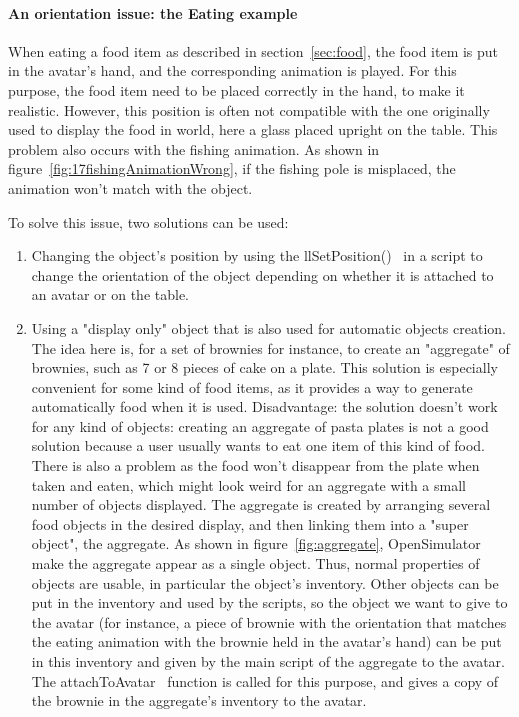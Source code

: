 {\begin{itemize}
\begin{itemize}
\paragraph{An orientation issue: the Eating example}
When eating a food item as described in section~\ref{sec:food}, the food item is put in the avatar's hand, and the corresponding animation is played. For this purpose, the food item need to be placed correctly in the hand, to make it realistic. However, 
this position is often not compatible with the one originally used to display the food in world, here a glass placed upright on the table. This problem also occurs with the fishing animation. As shown in figure~\ref{fig:17fishingAnimationWrong}, if the fishing pole is misplaced, the animation won't match with the object.

To solve this issue, two solutions can be used: 
\begin{enumerate}
\item Changing the object's position by using the llSetPosition()~\cite{llSetPositionWebsite} in a script to change the orientation of the object depending on whether it is attached to an avatar or on the table. 
\item Using a "display only" object that is also used for automatic objects creation. The idea here is, for a set of brownies for instance, to create an "aggregate" of brownies, such as 7 or 8 pieces of cake on a plate.
This solution is especially convenient for some kind of food items, as it provides a way to generate automatically food when it is used. Disadvantage: the solution doesn't work for any kind of objects: creating an aggregate of pasta plates is not a good solution because a user usually wants to eat one item of this kind of food. There is also a problem as the food won't disappear from the plate when taken and eaten, which might look weird for an aggregate with a small number of objects displayed.  
The aggregate is created by arranging several food objects in the desired display, and then linking them into a "super object", the aggregate. As shown in figure~\ref{fig:aggregate}, OpenSimulator make the aggregate appear as a single object. Thus, normal properties of objects are usable, in particular the object's inventory. Other objects can be put in the inventory and used by the scripts, so the object we want to give to the avatar (for instance, a piece of brownie with the orientation that matches the eating animation with the brownie held in the avatar's hand) can be put in this inventory and given by the main script of the aggregate to the avatar. The attachToAvatar~\cite{llAttachToAvatarWebsite} function is called for this purpose, and gives a copy of the brownie in the aggregate's inventory to the avatar. 
\end{enumerate}


\end{itemize}
\end{itemize}}

